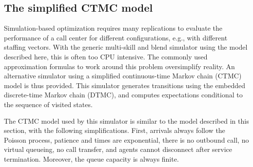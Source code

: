 \begin{comment}
\subsubsection{Choosing the time interval of an event}

When time intervals
correspond to the periods of the horizon, events concerning a call are
counted in
the statistical period associated with that call.
This usually corresponds to the period of arrival.
On the other hand, when the intervals correspond to batches (see
section~\ref{sec:expsteadystate}) in the context
of a simulation on an infinite horizon, all events concerning a call are
counted in the batch the call leaves the system.

\end{comment}

\subsection{The simplified CTMC model}

Simulation-based optimization requires many replications to evaluate
the performance of a call center for different configurations, e.g.,
with different staffing vectors.
With the generic multi-skill and blend simulator using the model
described here, this is often too CPU intensive.
The commonly used approximation formulas to work around this problem
oversimplify reality.
An alternative simulator using a simplified continuous-time Markov chain
(CTMC) model is thus
provided.
This simulator generates transitions using the embedded discrete-time
Markov chain (DTMC), and computes expectations conditional to the
sequence of visited states.

The CTMC model used by this simulator is similar to the model
described in this section, with the following simplifications.
First, arrivals always follow the Poisson process, patience and times are
exponential, there is no outbound call, no virtual queueing, no call
transfer, and agents cannot disconnect after service termination.
Moreover, the queue capacity is always finite.

